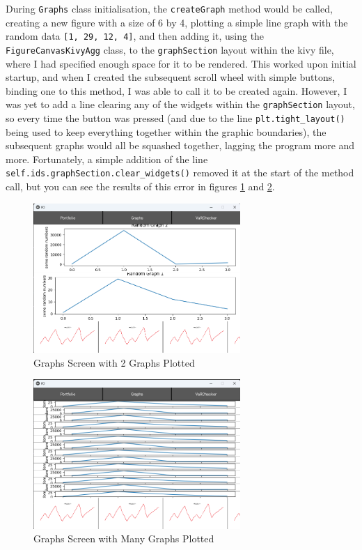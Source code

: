 \documentclass{article}
\begin{document}
\vspace{0.3cm}
During \texttt{Graphs} class initialisation, the \texttt{createGraph} method would be called, creating a new figure with a size of 6 by 4, plotting a simple line graph with the random data \texttt{[1, 29, 12, 4]}, and then adding it, using the \texttt{FigureCanvasKivyAgg} class, to the \texttt{graphSection} layout within the kivy file, where I had specified enough space for it to be rendered. This worked upon initial startup, and when I created the subsequent scroll wheel with simple buttons, binding one to this method, I was able to call it to be created again. However, I was yet to add a line clearing any of the widgets within the \texttt{graphSection} layout, so every time the button was pressed (and due to the line \texttt{plt.tight\_layout()} being used to keep everything together within the graphic boundaries), the subsequent graphs would all be squashed together, lagging the program more and more. Fortunately, a simple addition of the line \texttt{self.ids.graphSection.clear\_widgets()} removed it at the start of the method call, but you can see the results of this error in figures \ref{fig:Graphs Screen Error} and \ref{fig:Graphs Screen Error 2}.\\\vspace{0.3cm}

\begin{figure}[h]
  \centering
  \includegraphics[width=0.7\textwidth]{Images/Term 2 Images/image (7).png}
  \caption{Graphs Screen with 2 Graphs Plotted}
  \label{fig:Graphs Screen Error}
\end{figure}

\begin{figure}[h]
  \centering
  \includegraphics[width=0.7\textwidth]{Images/Term 2 Images/image (5).png}
  \caption{Graphs Screen with Many Graphs Plotted}
  \label{fig:Graphs Screen Error 2}
\end{figure}
\end{document}
